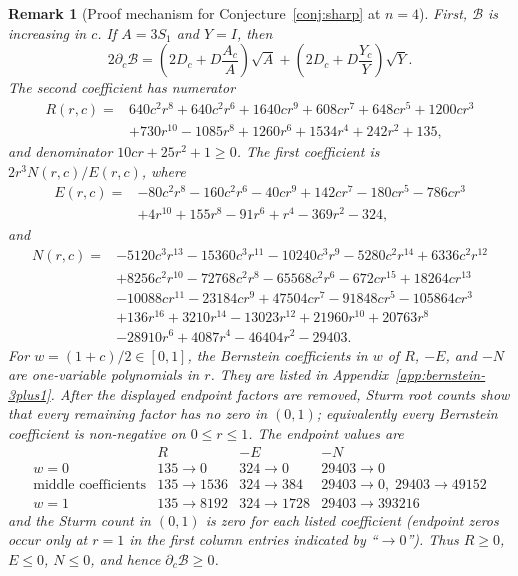 \documentclass[11pt]{article}
\newtheorem{remark}[theorem]{Remark}
\numberwithin{equation}{section}
\begin{document}
\begin{remark}[Proof mechanism for Conjecture~\ref{conj:sharp} at $n=4$]
First, $\mathcal B$ is increasing in $c$.  If $A=3S_1$ and $Y=I$, then
\[
  2\partial_c\mathcal B
  =\left(2D_c+D\frac{A_c}{A}\right)\sqrt A
  +\left(2D_c+D\frac{Y_c}{Y}\right)\sqrt Y .
\]
The second coefficient has numerator
\[
\begin{aligned}
R(r,c)=&640c^2r^8+640c^2r^6+1640cr^9+608cr^7+648cr^5+1200cr^3\\
&+730r^{10}-1085r^8+1260r^6+1534r^4+242r^2+135 ,
\end{aligned}
\]
and denominator $10cr+25r^2+1\ge0$.  The first coefficient is
$2r^3N(r,c)/E(r,c)$, where
\[
\begin{aligned}
E(r,c)=&-80c^2r^8-160c^2r^6-40cr^9+142cr^7-180cr^5-786cr^3\\
&+4r^{10}+155r^8-91r^6+r^4-369r^2-324 ,
\end{aligned}
\]
and
\[
\begin{aligned}
N(r,c)=&-5120c^3r^{13}-15360c^3r^{11}-10240c^3r^9
-5280c^2r^{14}+6336c^2r^{12}\\
&+8256c^2r^{10}-72768c^2r^8-65568c^2r^6
-672cr^{15}+18264cr^{13}\\
&-10088cr^{11}-23184cr^9+47504cr^7-91848cr^5-105864cr^3\\
&+136r^{16}+3210r^{14}-13023r^{12}+21960r^{10}
+20763r^8\\
&-28910r^6+4087r^4-46404r^2-29403 .
\end{aligned}
\]
For $w=(1+c)/2\in[0,1]$, the Bernstein coefficients in $w$ of
$R$, $-E$, and $-N$ are one-variable polynomials in $r$.  They are listed in
Appendix~\ref{app:bernstein-3plus1}.  After the displayed endpoint factors are
removed, Sturm root counts show that every remaining factor has no zero in
$(0,1)$; equivalently every Bernstein coefficient is non-negative on
$0\le r\le1$.  The endpoint values are
\[
\begin{array}{c|ccc}
&R&-E&-N\\ \hline
w=0&135\to0&324\to0&29403\to0\\
\text{middle coefficients}&135\to1536&324\to384&29403\to0,\;29403\to49152\\
w=1&135\to8192&324\to1728&29403\to393216
\end{array}
\]
and the Sturm count in $(0,1)$ is zero for each listed coefficient (endpoint
zeros occur only at $r=1$ in the first column entries indicated by ``$\to0$'').
Thus $R\ge0$, $E\le0$, $N\le0$, and hence $\partial_c\mathcal B\ge0$.


\end{remark}
\end{document}
